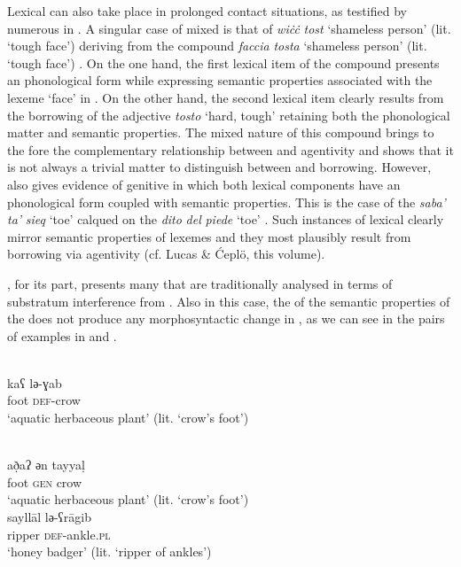 \documentclass[output=paper]{langsci/langscibook}
\begin{document}
Lexical  can also take place in prolonged contact situations, as testified by numerous   in . A singular case of mixed  is that of \textit{wi\.c\.c} \textit{tost} ‘shameless person’ (lit. ‘tough face’) deriving from the  compound \textit{faccia} \textit{tosta} ‘shameless person’ (lit. ‘tough face’) \citep{Aquilina1987}. On the one hand, the first lexical item of the compound presents an  phono\-logical form while expressing semantic properties associated with the lexeme ‘face’ in . On the other hand, the second lexical item clearly results from the borrowing of the adjective \textit{tosto} ‘hard, tough’ retaining both the  phono\-logical matter and semantic properties. The mixed nature of this compound brings to the fore the complementary relationship between  and  agentivity and shows that it is not always a trivial matter to distinguish between  and borrowing. However,  also gives evidence of genitive  in which both lexical components have an  phonological form coupled with  semantic properties. This is the case of the  \textit{saba'} \textit{ta'} \textit{sieq} ‘toe’ calqued on the  \textit{dito} \textit{del} \textit{piede} ‘toe’ \citep{Pepperforthcoming}. Such instances of lexical  clearly mirror semantic properties of  lexemes and they most plausibly result from borrowing via  agentivity (cf. Lucas \& Ćeplö, this volume). 

 , for its part, presents many  that are traditionally analysed in terms of substratum interference from   \citep{Taine-Cheikh2008chapter,Taine-Cheikh2012}. Also in this case, the  of the semantic properties of the  does not produce any morphosyntactic change in , as we can see in the pairs of examples in  and .

\ea\label{ex:crow}
\\
\gll   k{\R}aʕ lә-ɣ{\R}ab  \\
       foot \textsc{def}-crow\\
\glt   `aquatic herbaceous plant' (lit.  ‘crow’s foot’)

\\
\gll   að̣aʔ{\R} әn tayyaḷ \\
       foot \textsc{gen} crow \\
\glt   `aquatic herbaceous plant' (lit. ‘crow’s foot’)
\z
\ex \label{ex:ankle}
\\
\gll   sayllāl lә-ʕrāgib \\
       ripper \textsc{def}-ankle.\textsc{pl}\\
\glt   `honey badger' (lit. ‘ripper of ankles’)
\end{document}
